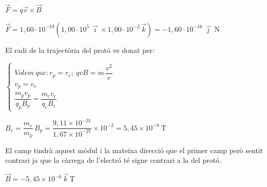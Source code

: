 \begin{solapartat}
 $\vec{F} = q\vec{v}\times\vec{B}$

 $\vec{F} = 1,60\cdot 10^{-19}\left(1,00\cdot 10^{5}\,\vec{\imath}\times 1,00\cdot 10^{-2}\,\vec{k}\right) = -1,60\cdot 10^{-16}\,\vec{\jmath}\ \mathrm{N}$
\end{solapartat}

\begin{solapartat}
El radi de la trajectòria del protó ve donat per:

 $\left\{\begin{array}{l}
\mathit{Volem\ que}: r_p = r_e;\ qvB = m\,\dfrac{v^2}{r} \\[1ex]
v_p = v_e \\[1ex]
\dfrac{m_p v_p}{q_p B_p} = \dfrac{m_e v_e}{q_e B_e}
\end{array}\right.$

 $B_e = \dfrac{m_e}{m_p}\,B_p = \dfrac{9,11\times 10^{-31}}{1,67\times 10^{-27}}\times 10^{-2} = 5,45\times 10^{-6}\ \mathrm{T}$

 El camp tindrà aquest mòdul i la mateixa direcció que el primer camp però sentit contrari ja que la càrrega de l'electró té signe contrari a la del protó.

$\vec{B} = -5,45\times 10^{-6}\,\vec{k}\ \mathrm{T}$
\end{solapartat}
